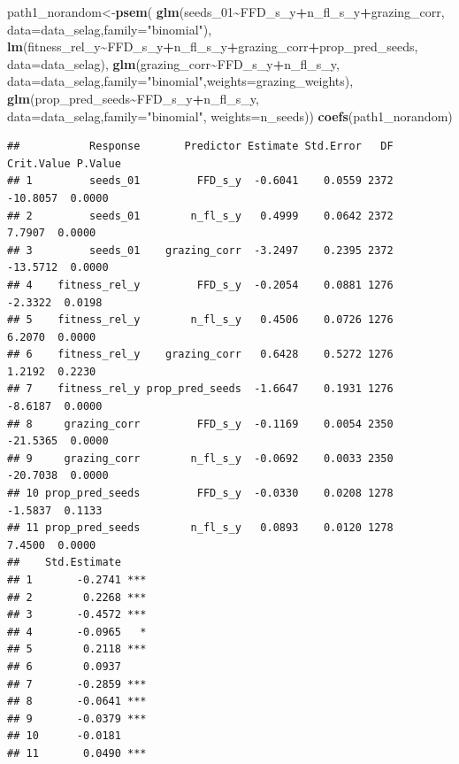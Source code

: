 \documentclass[
]{article}
\newenvironment{Shaded}{\begin{snugshade}}{\end{snugshade}}
\newcommand{\DataTypeTok}[1]{\textcolor[rgb]{0.13,0.29,0.53}{#1}}
\newcommand{\DecValTok}[1]{\textcolor[rgb]{0.00,0.00,0.81}{#1}}
\newcommand{\KeywordTok}[1]{\textcolor[rgb]{0.13,0.29,0.53}{\textbf{#1}}}
\newcommand{\NormalTok}[1]{#1}
\newcommand{\OperatorTok}[1]{\textcolor[rgb]{0.81,0.36,0.00}{\textbf{#1}}}
\newcommand{\StringTok}[1]{\textcolor[rgb]{0.31,0.60,0.02}{#1}}
\begin{document}
\begin{Shaded}
\begin{Highlighting}[]
\NormalTok{path1\_norandom\textless{}{-}}\KeywordTok{psem}\NormalTok{(}
  \KeywordTok{glm}\NormalTok{(seeds\_}\DecValTok{01}\OperatorTok{\textasciitilde{}}\NormalTok{FFD\_s\_y}\OperatorTok{+}\NormalTok{n\_fl\_s\_y}\OperatorTok{+}\NormalTok{grazing\_corr,}
                \DataTypeTok{data=}\NormalTok{data\_selag,}\DataTypeTok{family=}\StringTok{"binomial"}\NormalTok{),}
  \KeywordTok{lm}\NormalTok{(fitness\_rel\_y}\OperatorTok{\textasciitilde{}}\NormalTok{FFD\_s\_y}\OperatorTok{+}\NormalTok{n\_fl\_s\_y}\OperatorTok{+}\NormalTok{grazing\_corr}\OperatorTok{+}\NormalTok{prop\_pred\_seeds,}
               \DataTypeTok{data=}\NormalTok{data\_selag),}
  \KeywordTok{glm}\NormalTok{(grazing\_corr}\OperatorTok{\textasciitilde{}}\NormalTok{FFD\_s\_y}\OperatorTok{+}\NormalTok{n\_fl\_s\_y,}
                  \DataTypeTok{data=}\NormalTok{data\_selag,}\DataTypeTok{family=}\StringTok{"binomial"}\NormalTok{,}\DataTypeTok{weights=}\NormalTok{grazing\_weights),}
  \KeywordTok{glm}\NormalTok{(prop\_pred\_seeds}\OperatorTok{\textasciitilde{}}\NormalTok{FFD\_s\_y}\OperatorTok{+}\NormalTok{n\_fl\_s\_y,}
                  \DataTypeTok{data=}\NormalTok{data\_selag,}\DataTypeTok{family=}\StringTok{"binomial"}\NormalTok{,}
                  \DataTypeTok{weights=}\NormalTok{n\_seeds))}
\KeywordTok{coefs}\NormalTok{(path1\_norandom) }
\end{Highlighting}
\end{Shaded}

\begin{verbatim}
##           Response       Predictor Estimate Std.Error   DF Crit.Value P.Value
## 1         seeds_01         FFD_s_y  -0.6041    0.0559 2372   -10.8057  0.0000
## 2         seeds_01        n_fl_s_y   0.4999    0.0642 2372     7.7907  0.0000
## 3         seeds_01    grazing_corr  -3.2497    0.2395 2372   -13.5712  0.0000
## 4    fitness_rel_y         FFD_s_y  -0.2054    0.0881 1276    -2.3322  0.0198
## 5    fitness_rel_y        n_fl_s_y   0.4506    0.0726 1276     6.2070  0.0000
## 6    fitness_rel_y    grazing_corr   0.6428    0.5272 1276     1.2192  0.2230
## 7    fitness_rel_y prop_pred_seeds  -1.6647    0.1931 1276    -8.6187  0.0000
## 8     grazing_corr         FFD_s_y  -0.1169    0.0054 2350   -21.5365  0.0000
## 9     grazing_corr        n_fl_s_y  -0.0692    0.0033 2350   -20.7038  0.0000
## 10 prop_pred_seeds         FFD_s_y  -0.0330    0.0208 1278    -1.5837  0.1133
## 11 prop_pred_seeds        n_fl_s_y   0.0893    0.0120 1278     7.4500  0.0000
##    Std.Estimate    
## 1       -0.2741 ***
## 2        0.2268 ***
## 3       -0.4572 ***
## 4       -0.0965   *
## 5        0.2118 ***
## 6        0.0937    
## 7       -0.2859 ***
## 8       -0.0641 ***
## 9       -0.0379 ***
## 10      -0.0181    
## 11       0.0490 ***
\end{verbatim}
\end{document}
